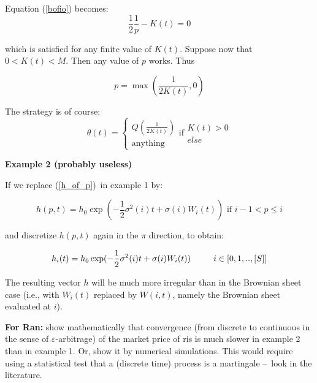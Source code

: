 \documentclass{article}
\begin{document}
Equation (\ref{bofio}) becomes:%
\begin{equation*}
\frac{1}{2}\frac{1}{p}-K(t)=0
\end{equation*}

which is satisfied for any finite value of $K(t)$. Suppose now that $%
0<K(t)<M $. Then any value of $p$ works. Thus

\begin{equation*}
p=\max (\frac{1}{2K(t)},0)
\end{equation*}

The strategy is of course:%
\begin{equation*}
\theta (t)=\left\{ 
\begin{array}{c}
Q(\frac{1}{2K(t)}) \\ 
\text{anything}%
\end{array}%
\right. \text{if}%
\begin{array}{c}
K(t)>0 \\ 
else%
\end{array}%
\end{equation*}

\bigskip

\textbf{Example 2 (probably useless)}

If we replace (\ref{h_of_p})\ in example 1 by:

\begin{equation*}
h(p,t)=h_{0}\exp (-\frac{1}{2}\sigma ^{2}(i)t+\sigma (i)W_{i}(t))\text{ if }%
i-1<p\leq i
\end{equation*}%
\bigskip

and discretize $h(p,t)$ again in the $\pi $ direction, to obtain:

\begin{equation*}
h_{i}(t)=h_{0}\exp (-\frac{1}{2}\sigma ^{2}(i)t+\sigma (i)W_{i}(t))\text{ \
\ \ \ \ }i\in \lbrack 0,1,..,[S]]
\end{equation*}%
\bigskip

The resulting vector $h$ will be much more irregular than in the Brownian
sheet case (i.e., with $W_{i}(t)$ replaced by $W(i,t)$, namely the Brownian
sheet evaluated at $i$).

\bigskip

\textbf{For Ran:} show mathematically that convergence (from discrete to
continuous in the sense of $\varepsilon $-arbitrage) of the market price of
ris is much slower in example 2 than in example 1. Or, show it by numerical
simulations. This would require using a statistical test that a (discrete
time) process is a martingale --\TEXTsymbol{>}\ look in the literature.
\end{document}
